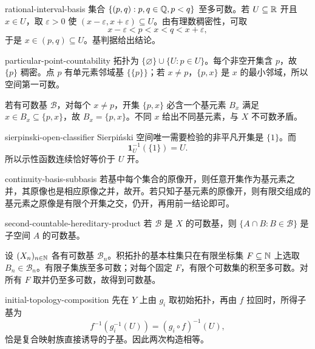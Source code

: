 \begin{solution}{rational-interval-basis}
集合 \(\{(p,q):p,q\in\mathbb{Q},p<q\}\) 至多可数。若 \(U\subseteq\mathbb{R}\) 开且 \(x\in U\)，取 \(\varepsilon>0\) 使 \((x-\varepsilon,x+\varepsilon)\subseteq U\)。由有理数稠密性，可取
\[
 x-\varepsilon<p<x<q<x+\varepsilon,
\]
于是 \(x\in(p,q)\subseteq U\)。基判据给出结论。
\end{solution}

\begin{solution}{particular-point-countability}
拓扑为 \(\{\varnothing\}\cup\{U:p\in U\}\)。每个非空开集含 \(p\)，故 \(\{p\}\) 稠密。点 \(p\) 有单元素邻域基 \(\{\{p\}\}\)；若 \(x\ne p\)，\(\{p,x\}\) 是 \(x\) 的最小邻域，所以空间第一可数。

若有可数基 \(\mathcal B\)，对每个 \(x\ne p\)，开集 \(\{p,x\}\) 必含一个基元素 \(B_x\) 满足 \(x\in B_x\subseteq\{p,x\}\)，故 \(B_x=\{p,x\}\)。不同 \(x\) 给出不同基元素，与 \(X\) 不可数矛盾。
\end{solution}

\begin{solution}{sierpinski-open-classifier}
Sierpiński 空间唯一需要检验的非平凡开集是 \(\{1\}\)。而
\[
 \mathbf1_U^{-1}(\{1\})=U.
\]
所以示性函数连续恰好等价于 \(U\) 开。
\end{solution}

\begin{solution}{continuity-basis-subbasis}
若基中每个集合的原像开，则任意开集作为基元素之并，其原像也是相应原像之并，故开。若只知子基元素的原像开，则有限交组成的基元素之原像是有限个开集之交，仍开，再用前一结论即可。
\end{solution}

\begin{solution}{second-countable-hereditary-product}
若 \(\mathcal B\) 是 \(X\) 的可数基，则 \(\{A\cap B:B\in\mathcal B\}\) 是子空间 \(A\) 的可数基。

设 \((X_n)_{n\in\mathbb{N}}\) 各有可数基 \(\mathcal B_n\)。积拓扑的基本柱集只在有限坐标集 \(F\subseteq\mathbb{N}\) 上选取 \(B_n\in\mathcal B_n\)。有限子集族至多可数；对每个固定 \(F\)，有限个可数集的积至多可数。对所有 \(F\) 取并仍至多可数，故得到可数基。
\end{solution}

\begin{solution}{initial-topology-composition}
先在 \(Y\) 上由 \(g_i\) 取初始拓扑，再由 \(f\) 拉回时，所得子基为
\[
 f^{-1}(g_i^{-1}(U))=(g_i\circ f)^{-1}(U),
\]
恰是复合映射族直接诱导的子基。因此两次构造相等。
\end{solution}

